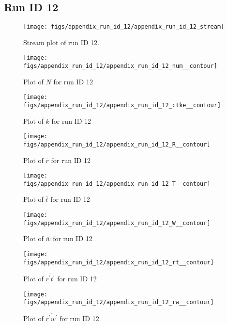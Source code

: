 \subsection{Run ID 12}
\begin{figure}[H]
\centering
\texttt{[image: figs/appendix\_run\_id\_12/appendix\_run\_id\_12\_stream]}
\caption{Stream plot of run ID 12.}
\label{fig:appendix_run_id_12_stream}
\end{figure}


\begin{figure}[H]
\centering
\texttt{[image: figs/appendix\_run\_id\_12/appendix\_run\_id\_12\_num\_\_contour]}
\caption{Plot of $N$ for run ID 12}
\label{fig:appendix_run_id_12_num__contour}
\end{figure}


\begin{figure}[H]
\centering
\texttt{[image: figs/appendix\_run\_id\_12/appendix\_run\_id\_12\_ctke\_\_contour]}
\caption{Plot of $k$ for run ID 12}
\label{fig:appendix_run_id_12_ctke__contour}
\end{figure}


\begin{figure}[H]
\centering
\texttt{[image: figs/appendix\_run\_id\_12/appendix\_run\_id\_12\_R\_\_contour]}
\caption{Plot of $\overline{r}$ for run ID 12}
\label{fig:appendix_run_id_12_R__contour}
\end{figure}


\begin{figure}[H]
\centering
\texttt{[image: figs/appendix\_run\_id\_12/appendix\_run\_id\_12\_T\_\_contour]}
\caption{Plot of $\overline{t}$ for run ID 12}
\label{fig:appendix_run_id_12_T__contour}
\end{figure}


\begin{figure}[H]
\centering
\texttt{[image: figs/appendix\_run\_id\_12/appendix\_run\_id\_12\_W\_\_contour]}
\caption{Plot of $\overline{w}$ for run ID 12}
\label{fig:appendix_run_id_12_W__contour}
\end{figure}


\begin{figure}[H]
\centering
\texttt{[image: figs/appendix\_run\_id\_12/appendix\_run\_id\_12\_rt\_\_contour]}
\caption{Plot of $\overline{r^\prime t^\prime}$ for run ID 12}
\label{fig:appendix_run_id_12_rt__contour}
\end{figure}


\begin{figure}[H]
\centering
\texttt{[image: figs/appendix\_run\_id\_12/appendix\_run\_id\_12\_rw\_\_contour]}
\caption{Plot of $\overline{r^\prime w^\prime}$ for run ID 12}
\label{fig:appendix_run_id_12_rw__contour}
\end{figure}


